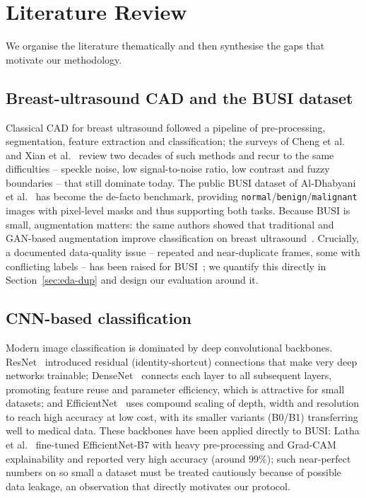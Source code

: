 \documentclass[11pt]{article}
\begin{document}
\section{Literature Review}
\label{sec:litreview}
We organise the literature thematically and then synthesise the gaps that
motivate our methodology.

\subsection{Breast-ultrasound CAD and the BUSI dataset}
Classical CAD for breast ultrasound followed a pipeline of pre-processing,
segmentation, feature extraction and classification; the surveys of Cheng et
al.~\cite{cheng2010survey} and Xian et al.~\cite{xian2018survey} review two
decades of such methods and recur to the same difficulties -- speckle noise, low
signal-to-noise ratio, low contrast and fuzzy boundaries -- that still dominate
today. The public BUSI dataset of Al-Dhabyani et
al.~\cite{aldhabyani2020busi} has become the de-facto benchmark, providing
\texttt{normal}/\texttt{benign}/\texttt{malignant} images with pixel-level masks
and thus supporting both tasks. Because BUSI is small, augmentation matters: the
same authors showed that traditional and GAN-based augmentation improve
classification on breast ultrasound~\cite{aldhabyani2019augmentation}. Crucially,
a documented data-quality issue -- repeated and near-duplicate frames, some with
conflicting labels -- has been raised for BUSI~\cite{pawlowska2023}; we quantify
this directly in Section~\ref{sec:eda-dup} and design our evaluation around it.

\subsection{CNN-based classification}
Modern image classification is dominated by deep convolutional backbones.
ResNet~\cite{he2016resnet} introduced residual (identity-shortcut) connections
that make very deep networks trainable; DenseNet~\cite{huang2017densenet}
connects each layer to all subsequent layers, promoting feature reuse and
parameter efficiency, which is attractive for small datasets; and
EfficientNet~\cite{tan2019efficientnet} uses compound scaling of depth, width
and resolution to reach high accuracy at low cost, with its smaller variants
(B0/B1) transferring well to medical data. These backbones have been applied
directly to BUSI: Latha et al.~\cite{latha2024effnetb7} fine-tuned
EfficientNet-B7 with heavy pre-processing and Grad-CAM~\cite{selvaraju2017gradcam}
explainability and reported very high accuracy (around $99\%$); such near-perfect
numbers on so small a dataset must be treated cautiously because of possible data
leakage, an observation that directly motivates our protocol.
\end{document}
